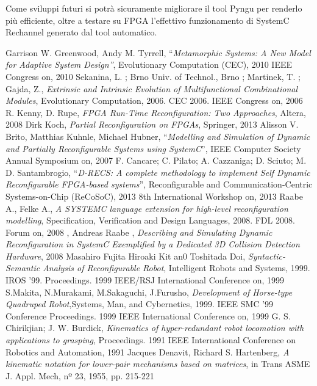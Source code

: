 \documentclass[a4paper,titlepage]{book}
\begin{document}
Come sviluppi futuri si potrà sicuramente migliorare il tool Pyngu per renderlo più efficiente, oltre a testare su FPGA l'effettivo funzionamento di SystemC Rechannel generato dal tool automatico.

\begin{thebibliography}{1}

 Garrison W. Greenwood, Andy M. Tyrrell, ``\textit{Metamorphic Systems: A New Model for Adaptive System Design''}, Evolutionary Computation (CEC), 2010 IEEE Congress on, 2010
 Sekanina, L. ; Brno Univ. of Technol., Brno ; Martinek, T. ; Gajda, Z., \textit{Extrinsic and Intrinsic Evolution of Multifunctional Combinational Modules}, Evolutionary Computation, 2006. CEC 2006. IEEE Congress on, 2006
 R. Kenny, D. Rupe, \textit{FPGA Run-Time Reconfiguration: Two Approaches}, Altera, 2008
 Dirk Koch, \textit{Partial Reconfiguration on FPGAs}, Springer, 2013
Alisson V. Brito, Matthias Kuhnle, Michael Hubner, ``\textit{Modelling and Simulation of Dynamic and Partially Reconfigurable Systems using SystemC}'', IEEE Computer Society Annual Symposium on, 2007
 F. Cancare;  C. Pilato;   A. Cazzaniga;  D. Sciuto;  M. D. Santambrogio, ``\textit{D-RECS: A complete methodology to implement Self Dynamic Reconfigurable FPGA-based systems}'', Reconfigurable and Communication-Centric Systems-on-Chip (ReCoSoC), 2013 8th International Workshop on, 2013
 Raabe A., Felke A., \textit{A SYSTEMC language extension for high-level reconfiguration modelling}, Specification, Verification and Design Languages, 2008. FDL 2008. Forum on, 2008
 , Andreas Raabe , \textit{Describing and Simulating Dynamic Reconfiguration in SystemC Exemplified by a Dedicated 3D Collision Detection Hardware}, 2008
 Masahiro Fujita Hiroaki Kit an0 Toshitada Doi, \textit{Syntactic-Semantic Analysis of Reconfigurable Robot}, Intelligent Robots and Systems, 1999. IROS '99. Proceedings. 1999 IEEE/RSJ International Conference on, 1999
 S.Makita, N.Murakami, M.Sakaguchi, J.Furusho, \textit{Development of Horse-type Quadruped Robot},Systems, Man, and Cybernetics, 1999. IEEE SMC '99 Conference Proceedings. 1999 IEEE International Conference on, 1999
 G. S. Chirikjian; J. W. Burdick, \textit{Kinematics of hyper-redundant robot locomotion with applications to grasping}, Proceedings. 1991 IEEE International Conference on Robotics and Automation, 1991
 Jacques Denavit, Richard S. Hartenberg, \textit{A kinematic notation for lower-pair mechanisms based on matrices}, in Trans ASME J. Appl. Mech, nº 23, 1955, pp. 215-221

\end{thebibliography}

\end{document}
